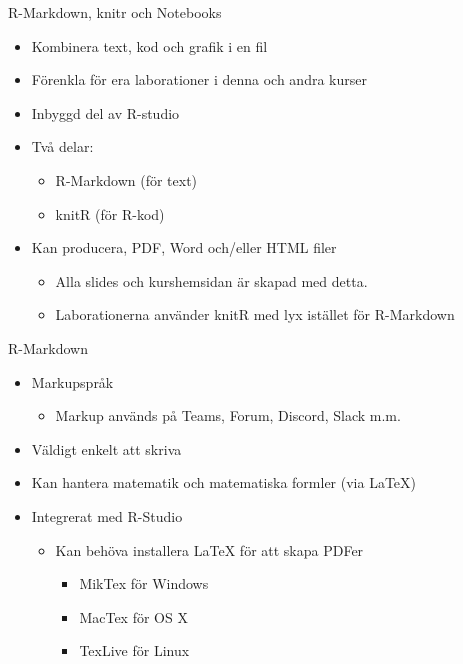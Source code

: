 \documentclass[
  11pt,
  ignorenonframetext,
  handout]{beamer}
\providecommand{\tightlist}{%
  \setlength{\itemsep}{0pt}\setlength{\parskip}{0pt}}
\begin{document}
\begin{frame}{R-Markdown, knitr och Notebooks}
\protect\hypertarget{r-markdown-knitr-och-notebooks-1}{}
\begin{itemize}
\tightlist
\item
  Kombinera text, kod och grafik i en fil
\item
  Förenkla för era laborationer i denna och andra kurser
\item
  Inbyggd del av R-studio
\item
  Två delar:

  \begin{itemize}
  \tightlist
  \item
    R-Markdown (för text)
  \item
    knitR (för R-kod)
  \end{itemize}
\item
  Kan producera, PDF, Word och/eller HTML filer

  \begin{itemize}
  \tightlist
  \item
    Alla slides och kurshemsidan är skapad med detta.
  \item
    Laborationerna använder knitR med lyx istället för R-Markdown
  \end{itemize}
\end{itemize}
\end{frame}

\begin{frame}{R-Markdown}
\protect\hypertarget{r-markdown}{}
\begin{itemize}
\tightlist
\item
  Markupspråk

  \begin{itemize}
  \tightlist
  \item
    Markup används på Teams, Forum, Discord, Slack m.m.
  \end{itemize}
\item
  Väldigt enkelt att skriva
\item
  Kan hantera matematik och matematiska formler (via LaTeX)
\item
  Integrerat med R-Studio

  \begin{itemize}
  \tightlist
  \item
    Kan behöva installera LaTeX för att skapa PDFer

    \begin{itemize}
    \tightlist
    \item
      MikTex för Windows
    \item
      MacTex för OS X
    \item
      TexLive för Linux
    \end{itemize}
  \end{itemize}
\end{itemize}
\end{frame}
\end{document}
